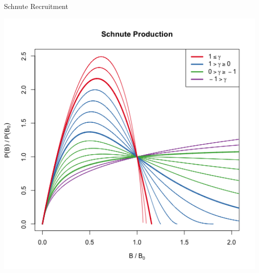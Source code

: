 \documentclass[ xcolor = pdftex, dvipsnames, table ]{beamer}
\begin{document}
\begin{frame}{Schnute Recruitment}
\begin{minipage}[h!]{0.52\textwidth}
{        \includegraphics[width=1.1\textwidth]{../../gpBias/g3.png} %
        }
\end{minipage}
\end{frame}
\end{document}
